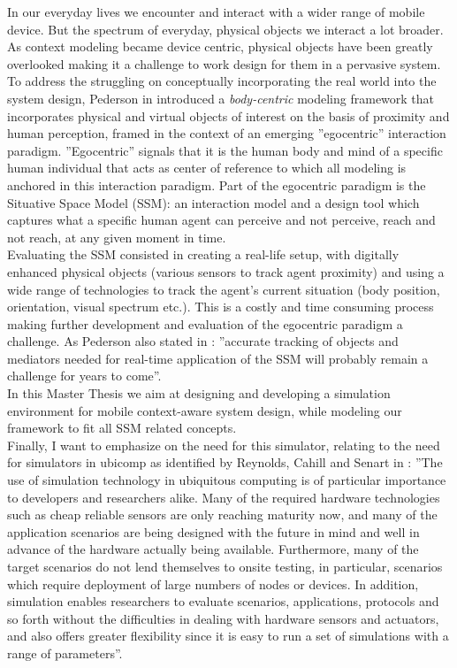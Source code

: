 In our everyday lives we encounter and interact with a wider range of mobile device. But the spectrum of everyday, physical objects we interact a lot broader. As context modeling became device centric, physical objects have been greatly overlooked making it a challenge to work design for them in a pervasive system. To address the struggling on conceptually incorporating the real world into the system design, Pederson in \cite{pederson2010towards} introduced a \emph{body-centric} modeling framework that incorporates physical and virtual objects of interest on the basis of proximity and human perception, framed in the context of an emerging ''egocentric'' interaction paradigm. ''Egocentric'' signals that it is the human body and mind of a specific human individual that acts as center of reference to which all modeling is anchored in this interaction paradigm. Part of the egocentric paradigm is the Situative Space Model (SSM): an interaction model and a design tool which captures what a specific human agent can perceive and not perceive, reach and not reach, at any given moment in time.\\

Evaluating the SSM consisted in creating a real-life setup, with digitally enhanced physical objects (various sensors to track agent proximity) and using a wide range of technologies to track the agent's current situation (body position, orientation, visual spectrum etc.). This is a costly and time consuming process making further development and evaluation of the egocentric paradigm a challenge. As Pederson also stated in \cite{pederson2011situative}: ''accurate tracking of objects and mediators needed for real-time application of the SSM will probably remain a challenge for years to come''.\\

In this Master Thesis we aim at designing and developing a simulation environment for mobile context-aware system design, while modeling our framework to fit all SSM related concepts.\\

Finally, I want to emphasize on the need for this simulator, relating to the need for simulators in ubicomp as identified by Reynolds, Cahill and Senart in \cite{reynolds2006requirements}: ''The use of simulation technology in ubiquitous computing is of particular importance to developers and researchers alike. Many of the required hardware technologies such as cheap reliable sensors are only reaching maturity now, and many of the application scenarios are being designed with the future in mind and well in advance of the hardware actually being available. Furthermore, many of the target scenarios do not lend themselves to onsite testing, in particular, scenarios which require deployment of large numbers of nodes or devices. In addition, simulation enables researchers to evaluate scenarios, applications, protocols and so forth without the difficulties in dealing with hardware sensors and actuators, and also offers greater flexibility since it is easy to run a set of simulations with a range of parameters''.\\









